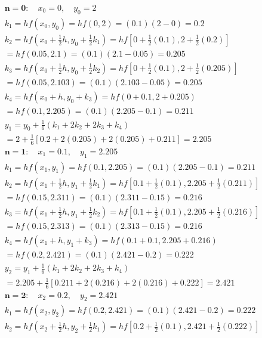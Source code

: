 \documentclass[10pt]{article}
\begin{document}
$$
\begin{aligned}
& \boldsymbol{n}=\mathbf{0}: \quad x_{0}=0, \quad y_{0}=2 \\
& k_{1}=h f\left(x_{0}, y_{0}\right)=h f(0,2)=(0.1)(2-0)=0.2 \\
& k_{2}=h f\left(x_{0}+\frac{1}{2} h, y_{0}+\frac{1}{2} k_{1}\right)=h f\left[0+\frac{1}{2}(0.1), 2+\frac{1}{2}(0.2)\right] \\
& =h f(0.05,2.1)=(0.1)(2.1-0.05)=0.205 \\
& k_{3}=h f\left(x_{0}+\frac{1}{2} h, y_{0}+\frac{1}{2} k_{2}\right)=h f\left[0+\frac{1}{2}(0.1), 2+\frac{1}{2}(0.205)\right] \\
& =h f(0.05,2.103)=(0.1)(2.103-0.05)=0.205 \\
& k_{4}=h f\left(x_{0}+h, y_{0}+k_{3}\right)=h f(0+0.1,2+0.205) \\
& =h f(0.1,2.205)=(0.1)(2.205-0.1)=0.211 \\
& y_{1}=y_{0}+\frac{1}{6}\left(k_{1}+2 k_{2}+2 k_{3}+k_{4}\right) \\
& =2+\frac{1}{6}[0.2+2(0.205)+2(0.205)+0.211]=2.205 \\
& \boldsymbol{n}=\mathbf{1}: \quad x_{1}=0.1, \quad y_{1}=2.205 \\
& k_{1}=h f\left(x_{1}, y_{1}\right)=h f(0.1,2.205)=(0.1)(2.205-0.1)=0.211 \\
& k_{2}=h f\left(x_{1}+\frac{1}{2} h, y_{1}+\frac{1}{2} k_{1}\right)=h f\left[0.1+\frac{1}{2}(0.1), 2.205+\frac{1}{2}(0.211)\right] \\
& =h f(0.15,2.311)=(0.1)(2.311-0.15)=0.216 \\
& k_{3}=h f\left(x_{1}+\frac{1}{2} h, y_{1}+\frac{1}{2} k_{2}\right)=h f\left[0.1+\frac{1}{2}(0.1), 2.205+\frac{1}{2}(0.216)\right] \\
& =h f(0.15,2.313)=(0.1)(2.313-0.15)=0.216 \\
& k_{4}=h f\left(x_{1}+h, y_{1}+k_{3}\right)=h f(0.1+0.1,2.205+0.216) \\
& =h f(0.2,2.421)=(0.1)(2.421-0.2)=0.222 \\
& y_{2}=y_{1}+\frac{1}{6}\left(k_{1}+2 k_{2}+2 k_{3}+k_{4}\right) \\
& =2.205+\frac{1}{6}[0.211+2(0.216)+2(0.216)+0.222]=2.421 \\
& \boldsymbol{n}=\mathbf{2}: \quad x_{2}=0.2, \quad y_{2}=2.421 \\
& k_{1}=h f\left(x_{2}, y_{2}\right)=h f(0.2,2.421)=(0.1)(2.421-0.2)=0.222 \\
& k_{2}=h f\left(x_{2}+\frac{1}{2} h, y_{2}+\frac{1}{2} k_{1}\right)=h f\left[0.2+\frac{1}{2}(0.1), 2.421+\frac{1}{2}(0.222)\right] \\

\end{aligned}$$
\end{document}
